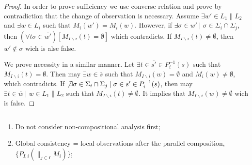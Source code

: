 \documentclass[a4paper, 10pt, conference]{ieeeconf} \IEEEoverridecommandlockouts
\begin{document}
\begin{proof}
In order to prove sufficiency we use converse relation and prove by
contradiction that the change of observation is necessary.
Assume $\exists w' \in L_1 \parallel L_2$ and $\exists w \in L_i$ such that
$M_i(w')= M_i(w)$.
However, if $\exists \sigma \in w' \mid \sigma \in \Sigma_i \cap \Sigma_j$, then
$(\forall t\sigma \in \overline{w'}) \left[M_{I\backslash i}(t) =
\emptyset\right]$ which contradicts. 
If $M_{I\backslash i}(t) \neq \emptyset$, then $w' \not \in \sigma$ wich is
alse false.

We prove necessity in a similar manner.
Let $\exists t\in \overline{s'} \in P_i^{-1}(s)$ such that $M_{I\backslash i}(t)
= \emptyset$. Then may $\exists w \in \overline{s}$ such that $M_{I\backslash
i}(w) = \emptyset$ and $M_i(w) \neq \emptyset$, which contradicts. If $\not
\exists \sigma \in \Sigma_i \cap \Sigma_j \mid \sigma \in s' \in P_i^{-1}(s)$,
then may $\exists t \in \overline{w} \mid w \in L_1 \parallel L_2$ such that
$M_{I\backslash i}(t) \neq \emptyset$. It implies that $M_{I\backslash
i}(w) \neq \emptyset$ wich is false.

\end{proof}

\newpage
\subsection{}
\begin{enumerate}
  \item Do not consider non-compositional analysis first;
  \item Global consistency = local observations after the parallel
  composition, $\{ P_{I,i}(\parallel_{j \in I}M_i)\}$;
         
\end{enumerate}
\end{document}
